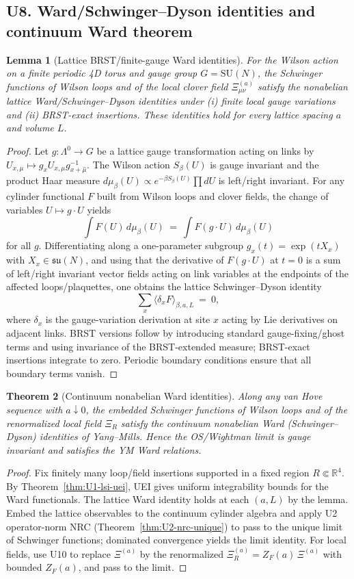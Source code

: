 \documentclass[11pt]{amsart}
\theoremstyle{plain}
\newtheorem{theorem}{Theorem}[section]
\newtheorem{lemma}[theorem]{Lemma}
\theoremstyle{definition}
\theoremstyle{remark}
\begin{document}
\subsection{U8. Ward/Schwinger–Dyson identities and continuum Ward theorem}
\begin{lemma}[Lattice BRST/finite-gauge Ward identities]
For the Wilson action on a finite periodic 4D torus and gauge group $G=\mathrm{SU}(N)$, the Schwinger functions of Wilson loops and of the local clover field $\Xi^{(a)}_{\mu\nu}$ satisfy the nonabelian lattice Ward/Schwinger–Dyson identities under (i) finite local gauge variations and (ii) BRST-exact insertions. These identities hold for every lattice spacing $a$ and volume $L$.
\end{lemma}
\begin{proof}
Let $g: \Lambda^0\to G$ be a lattice gauge transformation acting on links by $U_{x,\mu}\mapsto g_x U_{x,\mu} g_{x+\hat\mu}^{-1}$. The Wilson action $S_\beta(U)$ is gauge invariant and the product Haar measure $d\mu_\beta(U)\propto e^{-\beta S_\beta(U)}\prod dU$ is left/right invariant. For any cylinder functional $F$ built from Wilson loops and clover fields, the change of variables $U\mapsto g\cdot U$ yields
\[
  \int F(U)\,d\mu_\beta(U)\ =\ \int F(g\cdot U)\,d\mu_\beta(U)
\]
for all $g$. Differentiating along a one-parameter subgroup $g_x(t)=\exp(t X_x)$ with $X_x\in\mathfrak{su}(N)$, and using that the derivative of $F(g\cdot U)$ at $t=0$ is a sum of left/right invariant vector fields acting on link variables at the endpoints of the affected loops/plaquettes, one obtains the lattice Schwinger–Dyson identity
\[
  \sum_{x}\Big\langle \delta_x F\Big\rangle_{\beta,a,L}\ =\ 0,
\]
where $\delta_x$ is the gauge-variation derivation at site $x$ acting by Lie derivatives on adjacent links. BRST versions follow by introducing standard gauge-fixing/ghost terms and using invariance of the BRST-extended measure; BRST-exact insertions integrate to zero. Periodic boundary conditions ensure that all boundary terms vanish.
\end{proof}
\begin{theorem}[Continuum nonabelian Ward identities]\label{thm:U8-ward-cont}
Along any van Hove sequence with $a\downarrow 0$, the embedded Schwinger functions of Wilson loops and of the renormalized local field $\Xi_R$ satisfy the continuum nonabelian Ward (Schwinger–Dyson) identities of Yang–Mills. Hence the OS/Wightman limit is gauge invariant and satisfies the YM Ward relations.
\end{theorem}
\begin{proof}
Fix finitely many loop/field insertions supported in a fixed region $R\Subset\mathbb R^4$. By Theorem~\ref{thm:U1-lsi-uei}, UEI gives uniform integrability bounds for the Ward functionals. The lattice Ward identity holds at each $(a,L)$ by the lemma. Embed the lattice observables to the continuum cylinder algebra and apply U2 operator-norm NRC (Theorem~\ref{thm:U2-nrc-unique}) to pass to the unique limit of Schwinger functions; dominated convergence yields the limit identity. For local fields, use U10 to replace $\Xi^{(a)}$ by the renormalized $\Xi^{(a)}_R=Z_F(a)\,\Xi^{(a)}$ with bounded $Z_F(a)$, and pass to the limit.
\end{proof}
\end{document}
